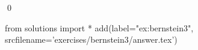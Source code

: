 
\begin{ex} 
  \label{ex:bernstein3}
  
  \qed
\end{ex} 
\begin{python0}
from solutions import *
add(label="ex:bernstein3",
    srcfilename='exercises/bernstein3/answer.tex') 
\end{python0}
